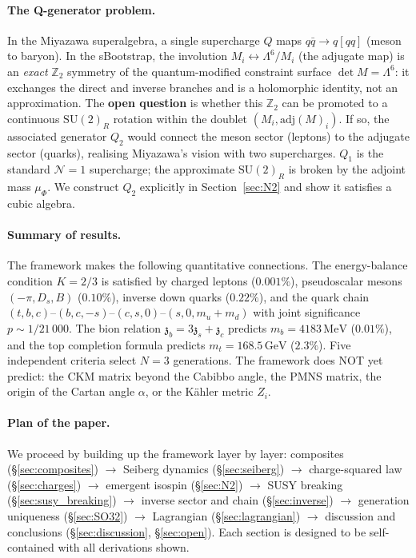 \documentclass[12pt,a4paper]{article}
\newcommand{\SU}{\mathrm{SU}}
\newcommand{\adj}{\mathrm{adj}}
\newcommand{\MeV}{\,\mathrm{MeV}}
\newcommand{\GeV}{\,\mathrm{GeV}}
\newcommand{\zch}{\mathfrak{z}}
\begin{document}
\paragraph{The Q-generator problem.}
In the Miyazawa superalgebra, a single supercharge $Q$ maps
$q\bar{q} \to q[qq]$ (meson to baryon).
In the sBootstrap, the involution $M_i \leftrightarrow
\Lambda^6/M_i$ (the adjugate map) is an \emph{exact}
$\mathbb{Z}_2$ symmetry of the quantum-modified constraint
surface $\det M = \Lambda^6$: it exchanges the direct and
inverse branches and is a holomorphic identity, not an
approximation.
The \textbf{open question} is whether this $\mathbb{Z}_2$ can
be promoted to a continuous $\SU(2)_R$ rotation within the
doublet $(M_i, \adj(M)_i)$.
If so, the associated generator $Q_2$ would connect the meson
sector (leptons) to the adjugate sector (quarks), realising
Miyazawa's vision with two supercharges.
$Q_1$ is the standard $\mathcal{N}{=}1$ supercharge; the
approximate $\SU(2)_R$ is broken by the adjoint mass $\mu_\Phi$.
We construct $Q_2$ explicitly in Section~\ref{sec:N2} and show
it satisfies a cubic algebra.

\paragraph{Summary of results.}
The framework makes the following quantitative connections.
The energy-balance condition $K = 2/3$ is satisfied by
charged leptons ($0.001\%$), pseudoscalar mesons $(-\pi, D_s, B)$
($0.10\%$), inverse down quarks ($0.22\%$), and the quark chain
$(t,b,c)$--$(b,c,-s)$--$(c,s,0)$--$(s,0,m_u{+}m_d)$ with joint
significance $p \sim 1/21\,000$.
The bion relation $\zch_b = 3\zch_s + \zch_c$ predicts
$m_b = 4183\MeV$ ($0.01\%$), and the top completion formula
predicts $m_t = 168.5\GeV$ ($2.3\%$).
Five independent criteria select $N = 3$ generations.
The framework does NOT yet predict: the CKM matrix beyond the
Cabibbo angle, the PMNS matrix, the origin of the Cartan angle
$\alpha$, or the K\"ahler metric $Z_i$.

\paragraph{Plan of the paper.}
We proceed by building up the framework layer by layer:
composites (\S\ref{sec:composites}) $\to$
Seiberg dynamics (\S\ref{sec:seiberg}) $\to$
charge-squared law (\S\ref{sec:charges}) $\to$
emergent isospin (\S\ref{sec:N2}) $\to$
SUSY breaking (\S\ref{sec:susy_breaking}) $\to$
inverse sector and chain (\S\ref{sec:inverse}) $\to$
generation uniqueness (\S\ref{sec:SO32}) $\to$
Lagrangian (\S\ref{sec:lagrangian}) $\to$
discussion and conclusions (\S\ref{sec:discussion},
\S\ref{sec:open}).
Each section is designed to be self-contained with all
derivations shown.
\end{document}
